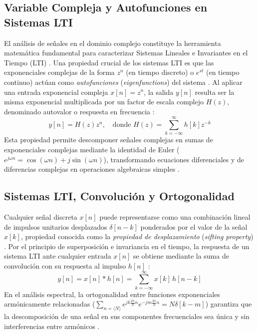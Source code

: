 \documentclass[conference]{IEEEtran}
\begin{document}
\subsection{Variable Compleja y Autofunciones en Sistemas LTI} 
El análisis de señales en el dominio complejo constituye la herramienta matemática fundamental para caracterizar Sistemas Lineales e Invariantes en el Tiempo (LTI) \cite{oppenheim1997}. Una propiedad crucial de los sistemas LTI es que las exponenciales complejas de la forma $z^n$ (en tiempo discreto) o $e^{st}$ (en tiempo continuo) actúan como \textit{autofunciones} (\textit{eigenfunctions}) del sistema \cite{oppenheim1997}. Al aplicar una entrada exponencial compleja $x[n] = z^n$, la salida $y[n]$ resulta ser la misma exponencial multiplicada por un factor de escala complejo $H(z)$, denominado autovalor o respuesta en frecuencia \cite{oppenheim1997}: 
\begin{equation} 
y[n] = H(z) z^n, \quad \text{donde } H(z) = \sum_{k=-\infty}^{\infty} h[k] z^{-k} 
\end{equation} 
Esta propiedad permite descomponer señales complejas en sumas de exponenciales complejas mediante la identidad de Euler ($e^{j\omega n} = \cos(\omega n) + j\sin(\omega n)$), transformando ecuaciones diferenciales y de diferencias complejas en operaciones algebraicas simples \cite{oppenheim1997}. 

\subsection{Sistemas LTI, Convolución y Ortogonalidad} 
Cualquier señal discreta $x[n]$ puede representarse como una combinación lineal de impulsos unitarios desplazados $\delta[n-k]$ ponderados por el valor de la señal $x[k]$, propiedad conocida como la \textit{propiedad de desplazamiento} (\textit{sifting property}) \cite{oppenheim1997}. Por el principio de superposición e invariancia en el tiempo, la respuesta de un sistema LTI ante cualquier entrada $x[n]$ se obtiene mediante la suma de convolución con su respuesta al impulso $h[n]$ \cite{oppenheim1997}: 
\begin{equation} 
y[n] = x[n] * h[n] = \sum_{k=-\infty}^{\infty} x[k] \, h[n-k] 
\end{equation} 
En el análisis espectral, la ortogonalidad entre funciones exponenciales armónicamente relacionadas ($\sum_{n=\langle N \rangle} e^{j k \frac{2\pi}{N} n} e^{-j m \frac{2\pi}{N} n} = N \delta[k-m]$) garantiza que la descomposición de una señal en sus componentes frecuenciales sea única y sin interferencias entre armónicos \cite{oppenheim1997}. 
\end{document}
